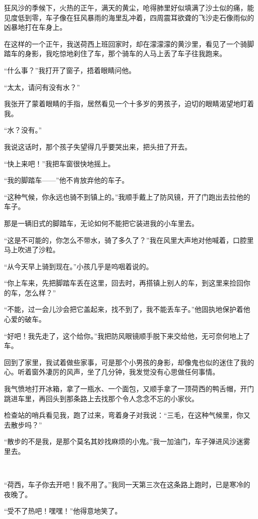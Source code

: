 \par 狂风沙的季候下，火热的正午，满天的黄尘，呛得肺里好似填满了沙土似的痛，能见度低到零，车子像在狂风暴雨的海里乱冲着，四周震耳欲聋的飞沙走石像雨似的凶暴地打在车身上。
\par 在这样的一个正午，我送荷西上班回家时，却在濛濛濛的黄沙里，看见了一个骑脚踏车的身影，我吃惊地刹住了车，那个骑车的人马上丢了车子往我跑来。
\par “什么事？”我打开了窗子，捂着眼睛问他。
\par “太太，请问有没有水？”
\par 我张开了蒙着眼睛的手指，居然看见一个十多岁的男孩子，迫切的眼睛渴望地盯着我。
\par “水？没有。”
\par 我说这话时，那个孩子失望得几乎要哭出来，把头扭了开去。
\par “快上来吧！”我把车窗很快地摇上。
\par “我的脚踏车——”他不肯放弃他的车子。
\par “这种气候，你永远也骑不到镇上的。”我顺手戴上了防风镜，开了门跑出去拉他的车子。
\par 那是一辆旧式的脚踏车，无论如何不能把它装进我的小车里去。
\par “这是不可能的，你怎么不带水，骑了多久了？”我在风里大声地对他喊着，口腔里马上吹进了沙粒。
\par “从今天早上骑到现在。”小孩几乎是呜咽着说的。
\par “你上车来，先把脚踏车丢在这里，回去时，再搭镇上别人的车，到这里来捡回你的车，怎么样？”
\par “不能，过一会儿沙会把它盖起来，找不到了，我不能丢车子。”他固执地保护着他心爱的破车。
\par “好吧！我先走了，这个给你。”我把防风眼镜顺手脱下来交给他，无可奈何地上了车。
\par 回到了家里，我试着做些家事，可是那个小男孩的身影，却像鬼也似的迷住了我的心。听着窗外凄厉的风声，坐了几分钟，我发觉没有心思做任何事情。
\par 我气愤地打开冰箱，拿了一瓶水、一个面包，又顺手拿了一顶荷西的鸭舌帽，开门跳进车里，再回头到那条路上去找那个令人念念不忘的小家伙。
\par 检查站的哨兵看见我，跑了过来，弯着身子对我说：“三毛，在这种气候里，你又去散步吗？”
\par “散步的不是我，是那个莫名其妙找麻烦的小鬼。”我一加油门，车子弹进风沙迷雾里去。
\par  
\par “荷西，车子你去开吧！我不用了。”我同一天第三次在这条路上跑时，已是寒冷的夜晚了。
\par “受不了热吧！嘿嘿！”他得意地笑了。
